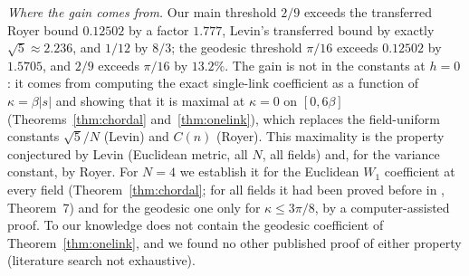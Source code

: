 \documentclass[11pt,a4paper]{article}
\theoremstyle{remark}
\theoremstyle{definition}
\theoremstyle{plain}
\theoremstyle{remark}
\begin{document}
\emph{Where the gain comes from.} Our main threshold $2/9$ exceeds the transferred Royer bound $0.12502$ by a
factor $1.777$, Levin's transferred bound by exactly $\sqrt5\approx2.236$, and $1/12$ by $8/3$; the geodesic
threshold $\pi/16$ exceeds $0.12502$ by $1.5705$, and $2/9$ exceeds $\pi/16$ by $13.2\%$. The gain is not in the
constants at $h=0$: it comes from computing the exact single-link coefficient as a function of $\kappa=\beta|s|$ and
showing that it is maximal at $\kappa=0$ on $[0,6\beta]$ (Theorems~\ref{thm:chordal} and~\ref{thm:onelink}), which
replaces the field-uniform constants $\sqrt5/N$ (Levin) and $C(n)$ (Royer). This maximality is the property
conjectured by Levin (Euclidean metric, all $N$, all fields) and, for the variance constant, by Royer. For $N=4$ we
establish it for the Euclidean $W_1$ coefficient at every field (Theorem~\ref{thm:chordal}; for all fields it had been
proved before in \cite{BB26}, Theorem~7) and for the geodesic one only for $\kappa\le3\pi/8$, by a computer-assisted proof.
To our knowledge \cite{BB26} does not contain the geodesic coefficient of Theorem~\ref{thm:onelink}, and we found no other published proof of
either property (literature search not exhaustive).
\end{document}
